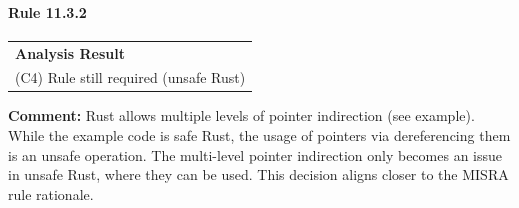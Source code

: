 \paragraph{Rule 11.3.2}
\begin{longtable}{p{13cm}}
\textbf{Analysis Result} \\
(C4) Rule still required (unsafe Rust) \\
\end{longtable}
\textbf{Comment:} Rust allows multiple levels of pointer indirection (see example). While the example code is safe Rust, the usage of pointers via dereferencing them is an unsafe operation. The multi-level pointer indirection only becomes an issue in unsafe Rust, where they can be used. This decision aligns closer to the MISRA rule rationale. \\


